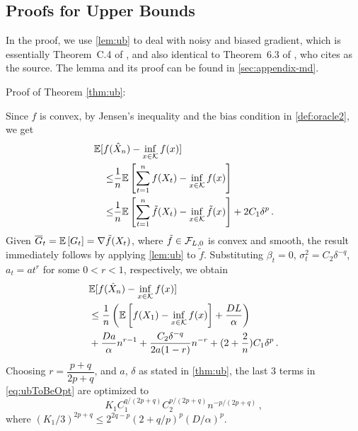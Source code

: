 \subsection{Proofs for Upper Bounds}
\label{sec:ub-proof}
In the proof, we use \cref{lem:ub} to deal with noisy and biased gradient, which is essentially Theorem~C.4 of \cite{MahdaviPhd:2014}, and also identical to Theorem~6.3 of \cite{Bu:Convex14}, who cites \cite{Dekel:minibatch12} as the source. 
The lemma and its proof can be found in \cref{sec:appendix-md}.

Proof of Theorem \ref{thm:ub}:

Since $f$ is convex, by Jensen's inequality and the bias condition in \cref{def:oracle2}, we get
\begin{align*}
\MoveEqLeft
 \E[f(\hat X_n) - \inf_{x \in \cK} f(x)] \\
 \le&  
 \dfrac{1}{n}\EE{ \sum_{t=1}^n f(X_t) - \inf_{x \in \cK}f(x) } \\
 \le &\dfrac{1}{n}\EE{ \sum_{t=1}^n \tilde{f}(X_t) - \inf_{x \in \cK}\tilde{f}(x) } +2C_1 \delta^p
 \,.
\end{align*}
Given $\overline{G}_t=\mathbb{E}\left[G_t\right] = \nabla \tilde{f}(X_t)$, where $\tilde{f}\in \mathcal{F}_{L,0}$ is convex and smooth,
the result immediately follows by applying \cref{lem:ub} to $\tilde{f}$. 
Substituting
 $\beta_t = 0$, $\sigma^2_t = C_2 \delta^{-q}$, $a_t=a t^r$ for some $0<r<1$, respectively, we obtain
 \begin{align}
& \mathbb{E}[f(\hat X_n) - \inf_{x \in \mathcal{K}} f(x)]  \nonumber\\
&\le \dfrac{1}{n}\left(\mathbb{E}\left[f(X_1)-\inf_{x \in \mathcal{K}}f(x)\right]+\dfrac{DL}{\alpha}  \right)\nonumber\\
&+\dfrac{Da}{\alpha} n^{r-1}+\dfrac{C_2 \delta^{-q}}{2a(1-r)}n^{-r}+ (2+\dfrac{2}{n})C_1\delta^p \,.
\label{eq:ubToBeOpt}
 \end{align}
 Choosing $r = \dfrac{p+q}{2p+q}$, and $a$, $\delta$ as stated in \cref{thm:ub}, the last $3$ terms in \eqref{eq:ubToBeOpt} are optimized to
 \[
 K_1 C_1^{q/(2p+q)} C_2^{p/(2p+q)} n ^{-p/(2p+q)} \,,
 \]
 where 
 $(K_1/3)^{2p+q} \le 2^{2q-p}\left(2+q/p \right)^p \left(D/\alpha\right)^{p}$.
 
